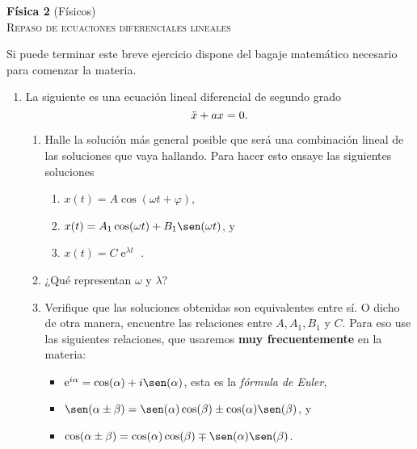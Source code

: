 \documentclass[11pt,spanish,a4paper]{article}
\begin{document}
\begin{center}
\textbf{Física 2} (Físicos) \hfill {}\\
	\textsc{\LARGE Repaso de ecuaciones diferenciales lineales}\\
\end{center}


Si puede terminar este breve ejercicio dispone del bagaje matemático necesario para comenzar la materia.

\begin{enumerate}

\item La siguiente es una ecuación lineal diferencial de segundo grado
\[
	\ddot{x} + a x = 0. \notag
\]
\begin{enumerate}
	\item	Halle la solución más general posible que será una combinación lineal de las soluciones que vaya hallando.
	Para hacer esto ensaye las siguientes soluciones
	\begin{enumerate}
		\item \( x(t) = A \cos(\omega t + \varphi ) \),
		\item \( x(t) = A_1 \cos( \omega t) + B_1 \sen(\omega t) \), y
		\item \( x(t) = C \operatorname{e}^{\lambda t} \) .
	\end{enumerate}
	\item ¿Qué representan \(\omega\) y \(\lambda\)?
	\item Verifique que las soluciones obtenidas son equivalentes entre sí.
	O dicho de otra manera, encuentre las relaciones entre \(A, A_1, B_1\) y \( C\).
	Para eso use las siguientes relaciones, que usaremos \textbf{muy frecuentemente} en la materia:
	\begin{itemize}
		\item \(\operatorname{e}^{i \alpha}= \cos(\alpha) + i \sen(\alpha) \), esta es la \textit{fórmula de Euler},
		\item \( \sen( \alpha \pm \beta ) = \sen(\alpha) \cos(\beta) \pm \cos(\alpha) \sen(\beta) \), y
		\item \( \cos( \alpha \pm \beta ) = \cos(\alpha) \cos(\beta) \mp \sen(\alpha) \sen(\beta) \).
	\end{itemize}
\end{enumerate}



\end{enumerate}
\end{document}
